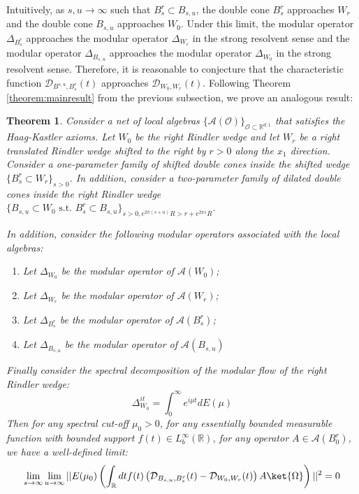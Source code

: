 \documentclass[a4paper,11pt]{article}
\newtheorem{theorem}{Theorem}
\theoremstyle{definition}
\theoremstyle{remark}
\newcommand{\lb}{\left(}
\newcommand{\rb}{\right)}
\begin{document}
Intuitively, as $s,u\rightarrow\infty$ such that $B^r_s\subset B_{s,u}$, the double cone $B^r_s$ approaches $W_r$ and the double cone $B_{s,u}$ approaches $W_0$. Under this limit, the modular operator $\Delta_{B^r_s}$ approaches the modular operator $\Delta_{W_r}$ in the strong resolvent sense\cite{takesaki2} and the modular operator $\Delta_{B_{s,u}}$ approaches the modular operator $\Delta_{W_0}$ in the strong resolvent sense. Therefore, it is reasonable to conjecture that the characteristic function $\mathcal{D}_{B^{s,u}, B^r_s}(t)$ approaches $\mathcal{D}_{W_0,W_r}(t)$. Following Theorem \ref{theorem:mainresult} from the previous subsection, we prove an analogous result:
\begin{theorem}\label{theorem:ballinsideball}
    Consider a net of local algebras $\{\mathcal{A}(\mathcal{O})\}_{\mathcal{O}\subset\mathbb{R}^{d,1}}$ that satisfies the Haag-Kastler axioms. Let $W_0$ be the right Rindler wedge and let $W_r$ be a right translated Rindler wedge shifted to the right by $r > 0$ along the $x_1$ direction. Consider a one-parameter family of shifted double cones inside the shifted wedge $\{B^r_s\subset W_r\}_{s > 0}$. In addition, consider a two-parameter family of dilated double cones inside the right Rindler wedge $\{B_{s,u}\subset W_0\text{ s.t.  }B^r_s\subset B_{s,u}\}_{s > 0, e^{2\pi(s+u)}R > r + e^{2\pi s}R}$. 

    In addition, consider the following modular operators associated with the local algebras:
    \begin{enumerate}
        \item Let $\Delta_{W_0}$ be the modular operator of $\mathcal{A}(W_0)$;
        \item Let $\Delta_{W_r}$ be the modular operator of $\mathcal{A}(W_r)$;
        \item Let $\Delta_{B^r_s}$ be the modular operator of $\mathcal{A}(B^r_s)$;
        \item Let $\Delta_{B_{s,u}}$ be the modular operator of $\mathcal{A}(B_{s,u})$
    \end{enumerate}
    Finally consider the spectral decomposition of the modular flow of the right Rindler wedge:
    \begin{equation}
        \Delta^{it}_{W_0} = \int_0^\infty e^{i\mu t}dE(\mu)
    \end{equation}
    Then for any spectral cut-off $\mu_0 > 0$, for any essentially bounded measurable function with bounded support $f(t)\in L^\infty_b(\mathbb{R})$, for any operator $A\in\mathcal{A}(B^r_0)$, we have a well-defined limit:
    \begin{align}
        \begin{split}
            \lim_{s\rightarrow\infty}\lim_{u\rightarrow\infty}||E(\mu_0)\lb\int_\mathbb{R} dt f(t)\lb \mathcal{D}_{B_{s,u}, B^r_s}(t) - \mathcal{D}_{W_0,W_r}(t) \rb A\ket{\Omega}\rb||^2 = 0
        \end{split}
    \end{align}
\end{theorem}
\end{document}
